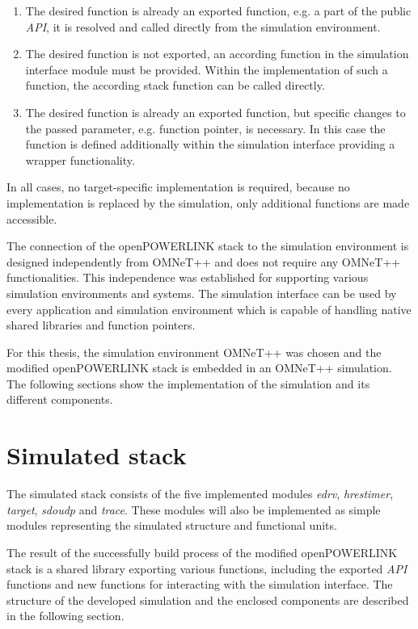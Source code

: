\begin{enumerate}
    \item The desired function is already an exported function, e.g. a part of the public \emph{API}, it is resolved and called directly from the simulation environment.
    \item The desired function is not exported, an according function in the simulation interface module must be provided.
    Within the implementation of such a function, the according stack function can be called directly.
    \item The desired function is already an exported function, but specific changes to the passed parameter, e.g. function pointer, is necessary.
    In this case the function is defined additionally within the simulation interface providing a wrapper functionality.
\end{enumerate}

In all cases, no target-specific implementation is required, because no implementation is replaced by the simulation, only additional functions are made accessible.

The connection of the openPOWERLINK stack to the simulation environment is designed independently from OMNeT++ and does not require any OMNeT++ functionalities.
This independence was established for supporting various simulation environments and systems.
The simulation interface can be used by every application and simulation environment which is capable of handling native shared libraries and function pointers.

For this thesis, the simulation environment OMNeT++ was chosen and the modified openPOWERLINK stack is embedded in an OMNeT++ simulation.
The following sections show the implementation of the simulation and its different components.

\section{Simulated stack}
\label{sec:porting_stack}
The simulated stack consists of the five implemented modules \emph{edrv}, \emph{hrestimer}, \emph{target}, \emph{sdoudp} and \emph{trace}.
These modules will also be implemented as simple modules representing the simulated structure and functional units.

\begin{sloppypar}
The result of the successfully build process of the modified openPOWERLINK stack is a shared library exporting various functions, including the exported \emph{API} functions and new functions for interacting with the simulation interface.
The structure of the developed simulation and the enclosed components are described in the following section.
\end{sloppypar}

